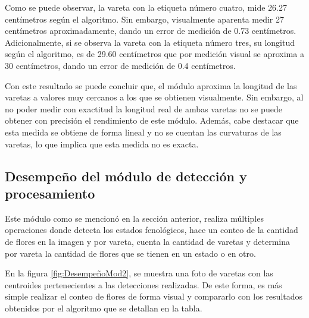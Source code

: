 Como se puede observar, la vareta con la etiqueta número cuatro, mide 26.27 centímetros según el algoritmo. Sin embargo, visualmente aparenta medir 27 centímetros aproximadamente, dando un error de medición de 0.73 centímetros. Adicionalmente, si se observa la vareta con la etiqueta número tres, su longitud según el algoritmo, es de 29.60 centímetros que por medición visual se aproxima a 30 centímetros, dando un error de medición de 0.4 centímetros. 

Con este resultado se puede concluir que, el módulo aproxima la longitud de las varetas a valores muy cercanos a los que se obtienen visualmente. Sin embargo, al no poder medir con exactitud la longitud real de ambas varetas no se puede obtener con precisión el rendimiento de este módulo. Además, cabe destacar que esta medida se obtiene de forma lineal y no se cuentan las curvaturas de las varetas, lo que implica que esta medida no es exacta.

\subsection{Desempeño del módulo de detección y procesamiento}

Este módulo como se mencionó en la sección anterior, realiza múltiples operaciones donde detecta los estados fenológicos, hace un conteo de la cantidad de flores en la imagen y por vareta, cuenta la cantidad de varetas y determina por vareta la cantidad de flores que se tienen en un estado o en otro.

En la figura \ref{fig:DesempeñoMod2}, se muestra una foto de varetas con las centroides pertenecientes a las detecciones realizadas. De este forma, es más simple realizar el conteo de flores de forma visual y compararlo con los resultados obtenidos por el algoritmo que se detallan en la tabla.

